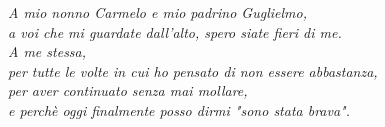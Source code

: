 \newpage
\cleardoublepage 
\thispagestyle{empty} %

\vspace*{\fill} %

\begin{flushright}
    \textit{A mio nonno Carmelo e mio padrino Guglielmo, \\ a voi che mi guardate dall'alto, spero siate fieri di me.} \\[1cm]
    \textit{A me stessa, \\ per tutte le volte in cui ho pensato di non essere abbastanza, \\ per aver continuato senza mai mollare, \\ e perchè  oggi finalmente posso dirmi "sono stata brava".}
\end{flushright}

\vspace*{\fill} %

\clearpage %